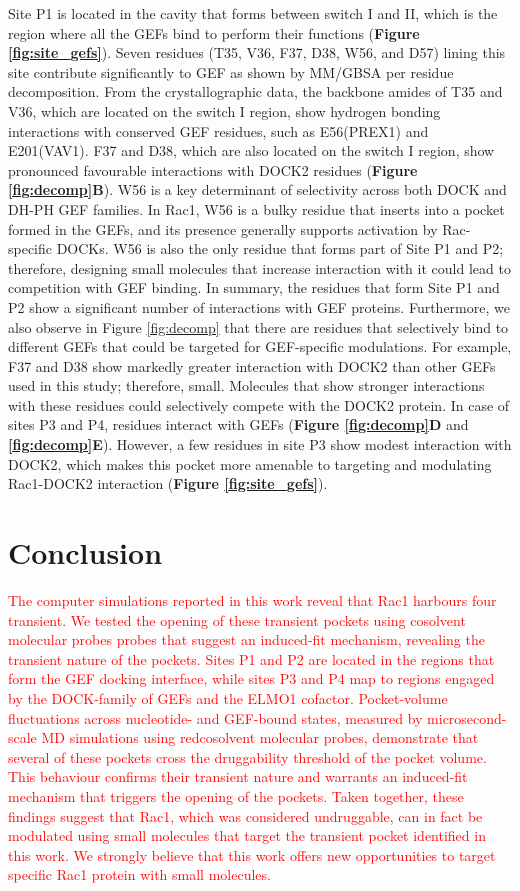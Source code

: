 \documentclass[12pt,a4paper]{achemso}
\begin{document}
Site P1 is located in the cavity that forms between switch I and II, which is the region where all the GEFs bind to perform their functions (\textbf{Figure \ref{fig:site_gefs}}). Seven residues (T35, V36, F37, D38, W56, and D57) lining this site contribute significantly to GEF as shown by MM/GBSA per residue decomposition. From the crystallographic data, the backbone amides of T35 and V36, which are located on the switch I region, show hydrogen bonding interactions with conserved GEF residues, such as E56(PREX1)\cite{prex1pdb} and E201(VAV1)\cite{vav1pdb}. F37 and D38, which are also located on the switch I region, show pronounced favourable interactions with DOCK2 residues (\textbf{Figure \ref{fig:decomp}B}). W56 is a key determinant of selectivity across both DOCK and DH-PH GEF families. In Rac1, W56 is a bulky residue that inserts into a pocket formed in the GEFs, and its presence generally supports activation by Rac-specific DOCKs. W56 is also the only residue that forms part of Site P1 and P2; therefore, designing small molecules that increase interaction with it could lead to competition with GEF binding. In summary, the residues that form Site P1 and P2 show a significant number of interactions with GEF proteins. Furthermore, we also observe in Figure \ref{fig:decomp} that there are residues that selectively bind to different GEFs that could be targeted for GEF-specific modulations. For example,  F37 and D38 show markedly greater interaction with DOCK2 than other GEFs used in this study; therefore, small. Molecules that show stronger interactions with these residues could selectively compete with the DOCK2 protein. In case of sites P3 and P4, residues interact with GEFs (\textbf{Figure \ref{fig:decomp}D} and \textbf{\ref{fig:decomp}E}). However, a few residues in site P3 show modest interaction with DOCK2, which makes this pocket more amenable to targeting and modulating Rac1-DOCK2 interaction (\textbf{Figure \ref{fig:site_gefs}}).

\section{Conclusion}
\textcolor{red}{The computer simulations reported in this work reveal that Rac1 harbours four transient. We tested the opening of these transient pockets using cosolvent molecular probes probes that suggest an induced-fit mechanism, revealing the transient nature of the pockets. Sites P1 and P2 are located in the regions that form the GEF docking interface, while sites P3 and P4 map to regions engaged by the DOCK-family of GEFs and the ELMO1 cofactor. Pocket-volume fluctuations across nucleotide- and GEF-bound states, measured by microsecond-scale MD simulations using redcosolvent molecular probes, demonstrate that several of these pockets cross the druggability threshold of the pocket volume. This behaviour confirms their transient nature and warrants an induced-fit mechanism that triggers the opening of the pockets. Taken together, these findings suggest that Rac1, which was considered undruggable, can in fact be modulated using small molecules that target the transient pocket identified in this work. We strongly believe that this work offers new opportunities to target specific Rac1 protein with small molecules.} 
\end{document}
